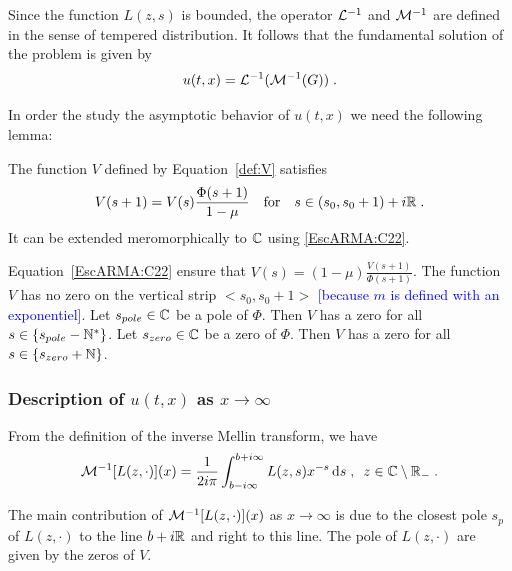 \documentclass[11pt]{amsart}
\newcommand{\diff}{\,\mathrm{d}}
\newcommand{\ndr}[1]{\textcolor{blue}{[#1]}}
\begin{document}
Since the function $L(z,s)$ is bounded, the operator $\mathcal{L}^{-1}$ and $ \mathcal{M}^{-1}$ are defined in the sense of tempered distribution. It follows that the fundamental solution of the problem is given by 
    \begin{equation}
        u(t,x) = \mathcal{L}^{-1} (\mathcal{M}^{-1} (G))
        \; .
    \end{equation}
    
In order the study the asymptotic behavior of $u(t,x)$ we need the following lemma: 
\begin{lemma}The function $V$ defined by Equation~\eqref{def:V} satisfies
    \begin{equation}
        V(s+1) = V(s)\frac{\Phi(s+1)}{1-\mu}
        \quad \text{for} \quad
        s \in (s_0, s_0+1) + i\mathbb{R}
        \; .
        \label{EscARMA:C22}
    \end{equation}
It can be extended meromorphically to $\mathbb{C}$ using \eqref{EscARMA:C22}.
\end{lemma}

\begin{remark}
    Equation~\eqref{EscARMA:C22} ensure that $V(s) = (1-\mu)\frac{V(s+1)}{\Phi(s+1)}$. 
    The function $V$ has no zero on the vertical strip $<s_0, s_0+1>$ \ndr{because $m$ is defined with an exponentiel}. Let $s_{pole} \in \mathbb{C}$ be a pole of $\Phi$. Then $V$ has a zero for all $s \in \{s_{pole} - \mathbb{N}^* \}$.
    Let $s_{zero} \in \mathbb{C}$ be a zero of $\Phi$. Then $V$ has a zero for all 
    $s \in \{s_{zero} + \mathbb{N}\}$. 
\end{remark}

    
\subsubsection{Description of $u(t,x)$ as $x \to \infty$}\text{\\}

From the definition of the inverse Mellin transform, we have
\begin{equation}
    \Mcal^{-1}[L(z,\cdot)](x) = \frac{1}{2i\pi} \int_{b-i\infty}^{b+i\infty} L(z,s)x^{-s}\diff s
    \eqsepv
    z \in \CC \setminus \RR_-
    \eqfinp
\end{equation}

The main contribution of $\mathcal{M}^{-1}[L(z,\cdot)](x)$ as $x \to \infty$ is due to the closest pole $s_p$ of $L(z,\cdot)$ to the line $b+i\mathbb{R}$ and right to this line. The pole of $L(z,\cdot)$ are given by the zeros of $V$. 
\end{document}
